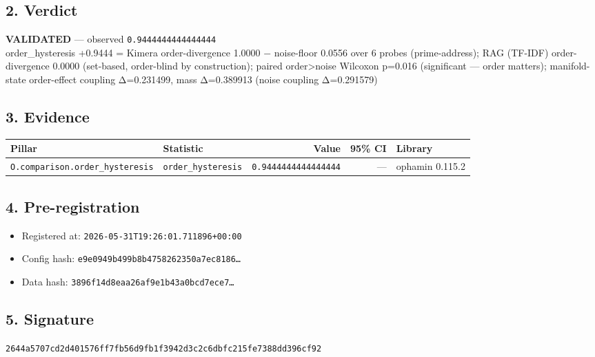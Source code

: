 \documentclass{article}
\begin{document}
\subsection*{2. Verdict}
\textcolor{validated}{\textbf{VALIDATED}} --- observed \texttt{0.9444444444444444}\\
order\_hysteresis +0.9444 = Kimera order-divergence 1.0000 − noise-floor 0.0556 over 6 probes (prime-address); RAG (TF-IDF) order-divergence 0.0000 (set-based, order-blind by construction); paired order>noise Wilcoxon p=0.016 (significant — order matters); manifold-state order-effect coupling Δ=0.231499, mass Δ=0.389913 (noise coupling Δ=0.291579)
\subsection*{3. Evidence}
\begin{tabular}{llrrl}\toprule
\textbf{Pillar} & \textbf{Statistic} & \textbf{Value} & \textbf{95\% CI} & \textbf{Library} \\\midrule
\texttt{O.comparison.order\_hysteresis} & \texttt{order\_hysteresis} & \texttt{0.9444444444444444} & --- & ophamin 0.115.2 \\
\bottomrule\end{tabular}
\subsection*{4. Pre-registration}
\begin{itemize}
\item Registered at: \texttt{2026-05-31T19:26:01.711896+00:00}
\item Config hash: \texttt{e9e0949b499b8b4758262350a7ec8186\dots}
\item Data hash: \texttt{3896f14d8eaa26af9e1b43a0bcd7ece7\dots}
\end{itemize}
\subsection*{5. Signature}
\texttt{2644a5707cd2d401576ff7fb56d9fb1f3942d3c2c6dbfc215fe7388dd396cf92}\\
\end{document}
